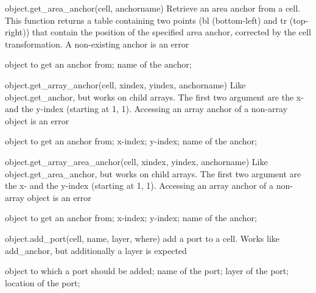 \begin{APIfunc}{object.get\_area\_anchor(cell, anchorname)}
    Retrieve an area anchor from a cell. This function returns a table containing two points (bl (bottom-left) and tr (top-right)) that contain the position of the specified area anchor, corrected by the cell transformation. A non-existing anchor is an error
    \begin{APIparameters}
            object to get an anchor from;
            name of the anchor;
    \end{APIparameters}
\end{APIfunc}
\begin{APIfunc}{object.get\_array\_anchor(cell, xindex, yindex, anchorname)}
    Like object.get\_anchor, but works on child arrays. The first two argument are the x- and the y-index (starting at 1, 1). Accessing an array anchor of a non-array object is an error
    \begin{APIparameters}
            object to get an anchor from;
            x-index;
            y-index;
            name of the anchor;
    \end{APIparameters}
\end{APIfunc}
\begin{APIfunc}{object.get\_array\_area\_anchor(cell, xindex, yindex, anchorname)}
    Like object.get\_area\_anchor, but works on child arrays. The first two argument are the x- and the y-index (starting at 1, 1). Accessing an array anchor of a non-array object is an error
    \begin{APIparameters}
            object to get an anchor from;
            x-index;
            y-index;
            name of the anchor;
    \end{APIparameters}
\end{APIfunc}
\begin{APIfunc}{object.add\_port(cell, name, layer, where)}
    add a port to a cell. Works like add\_anchor, but additionally a layer is expected
    \begin{APIparameters}
            object to which a port should be added;
            name of the port;
            layer of the port;
            location of the port;
    \end{APIparameters}
\end{APIfunc}
